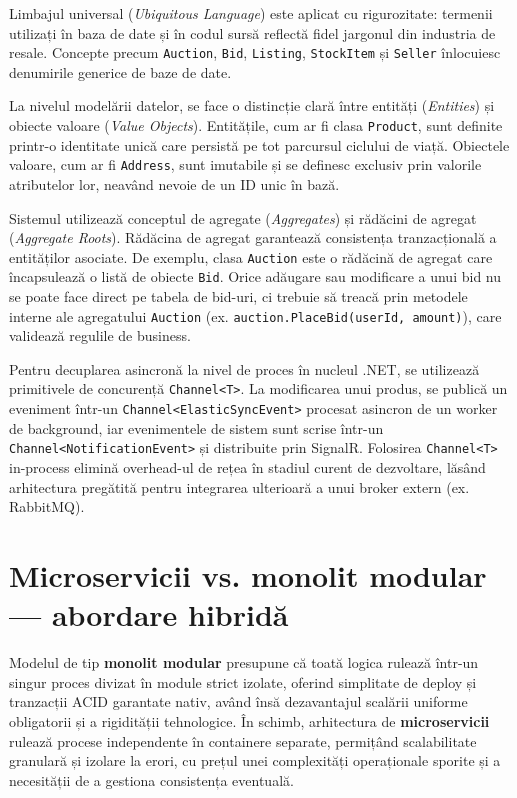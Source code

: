 Limbajul universal (\textit{Ubiquitous Language}) este aplicat cu rigurozitate: termenii utilizați în baza de date și în codul sursă reflectă fidel jargonul din industria de resale. Concepte precum \texttt{Auction}, \texttt{Bid}, \texttt{Listing}, \texttt{StockItem} și \texttt{Seller} înlocuiesc denumirile generice de baze de date.

La nivelul modelării datelor, se face o distincție clară între entități (\textit{Entities}) și obiecte valoare (\textit{Value Objects}). Entitățile, cum ar fi clasa \texttt{Product}, sunt definite printr-o identitate unică care persistă pe tot parcursul ciclului de viață. Obiectele valoare, cum ar fi \texttt{Address}, sunt imutabile și se definesc exclusiv prin valorile atributelor lor, neavând nevoie de un ID unic în bază.

Sistemul utilizează conceptul de agregate (\textit{Aggregates}) și rădăcini de agregat (\textit{Aggregate Roots}). Rădăcina de agregat garantează consistența tranzacțională a entităților asociate. De exemplu, clasa \texttt{Auction} este o rădăcină de agregat care încapsulează o listă de obiecte \texttt{Bid}. Orice adăugare sau modificare a unui bid nu se poate face direct pe tabela de bid-uri, ci trebuie să treacă prin metodele interne ale agregatului \texttt{Auction} (ex. \texttt{auction.PlaceBid(userId, amount)}), care validează regulile de business.

Pentru decuplarea asincronă la nivel de proces în nucleul .NET, se utilizează primitivele de concurență \texttt{Channel<T>}. La modificarea unui produs, se publică un eveniment într-un \texttt{Channel<ElasticSyncEvent>} procesat asincron de un worker de background, iar evenimentele de sistem sunt scrise într-un \texttt{Channel<NotificationEvent>} și distribuite prin SignalR. Folosirea \texttt{Channel<T>} in-process elimină overhead-ul de rețea în stadiul curent de dezvoltare, lăsând arhitectura pregătită pentru integrarea ulterioară a unui broker extern (ex. RabbitMQ).

\section{Microservicii vs. monolit modular --- abordare hibridă}

Modelul de tip \textbf{monolit modular} presupune că toată logica rulează într-un singur proces divizat în module strict izolate, oferind simplitate de deploy și tranzacții ACID garantate nativ, având însă dezavantajul scalării uniforme obligatorii și a rigidității tehnologice. În schimb, arhitectura de \textbf{microservicii} rulează procese independente în containere separate, permițând scalabilitate granulară și izolare la erori, cu prețul unei complexități operaționale sporite și a necesității de a gestiona consistența eventuală.

